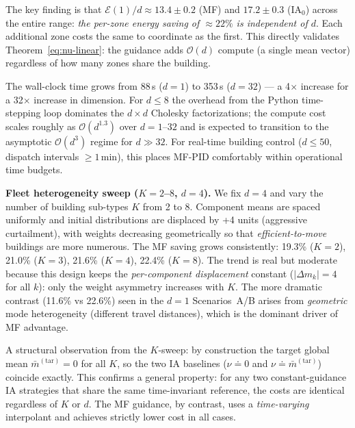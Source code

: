\documentclass[11pt,onecolumn]{article}
\newcommand{\calE}{\mathcal{E}}
\begin{document}
The key finding is that $\calE(1)/d \approx 13.4\pm0.2$ (MF) and $17.2\pm0.3$ (IA$_0$) across the entire range: \emph{the per-zone energy saving of $\approx22\%$ is independent of $d$}. Each additional zone costs the same to coordinate as the first. This directly validates Theorem~\eqref{eq:nu-linear}: the guidance adds $\mathcal{O}(d)$ compute (a single mean vector) regardless of how many zones share the building.

The wall-clock time grows from 88\,s ($d=1$) to 353\,s ($d=32$) --- a 4$\times$ increase for a 32$\times$ increase in dimension. For $d\leq 8$ the overhead from the Python time-stepping loop dominates the $d\times d$ Cholesky factorizations; the compute cost scales roughly as $\mathcal{O}(d^{1.3})$ over $d=1$--$32$ and is expected to transition to the asymptotic $\mathcal{O}(d^3)$ regime for $d\gg 32$. For real-time building control ($d\leq 50$, dispatch intervals $\geq\!1$\,min), this places MF-PID comfortably within operational time budgets.

\textbf{Fleet heterogeneity sweep ($K=2$--$8$, $d=4$).} We fix $d=4$ and vary the number of building sub-types $K$ from 2 to 8. Component means are spaced uniformly and initial distributions are displaced by +4 units (aggressive curtailment), with weights decreasing geometrically so that \emph{efficient-to-move} buildings are more numerous. The MF saving grows consistently: 19.3\% ($K=2$), 21.0\% ($K=3$), 21.6\% ($K=4$), 22.4\% ($K=8$). The trend is real but moderate because this design keeps the \emph{per-component displacement} constant ($|\Delta m_k|=4$ for all $k$): only the weight asymmetry increases with $K$. The more dramatic contrast (11.6\% vs 22.6\%) seen in the $d=1$ Scenarios~A/B arises from \emph{geometric} mode heterogeneity (different travel distances), which is the dominant driver of MF advantage.

A structural observation from the $K$-sweep: by construction the target global mean $\bar m^{(\mathrm{tar})}=0$ for all $K$, so the two IA baselines ($\nu\doteq 0$ and $\nu\doteq\bar m^{(\mathrm{tar})}$) coincide exactly. This confirms a general property: for any two constant-guidance IA strategies that share the same time-invariant reference, the costs are identical regardless of $K$ or $d$. The MF guidance, by contrast, uses a \emph{time-varying} interpolant and achieves strictly lower cost in all cases.
\end{document}
